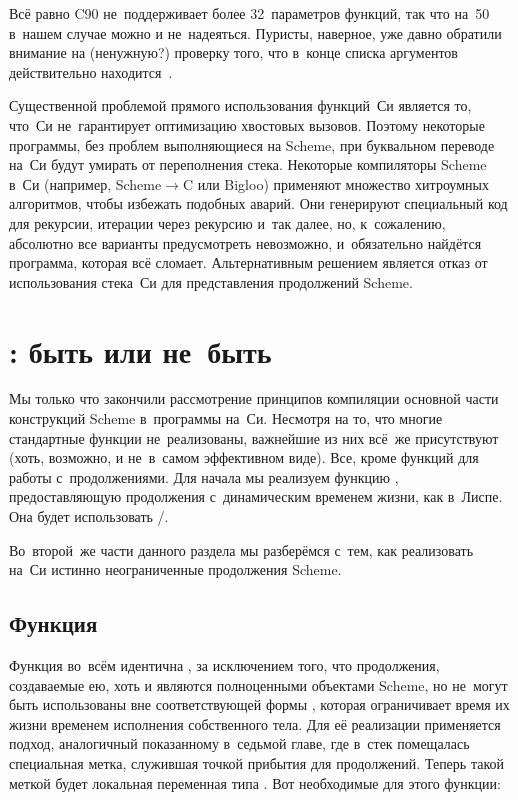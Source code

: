 Всё равно C90 не~поддерживает более 32~параметров функций, так что на~50 в~нашем
случае можно и не~надеяться. Пуристы, наверное, уже давно обратили внимание на
(ненужную?) проверку того, что в~конце списка аргументов 
действительно находится~\ic{()}.

\bigskip

Существенной проблемой прямого использования функций~Си является то, что~Си
не~гарантирует оптимизацию хвостовых вызовов. Поэтому некоторые программы, без
проблем выполняющиеся на Scheme, при буквальном переводе на~Си будут умирать
от переполнения стека. Некоторые компиляторы Scheme в~Си (например, Scheme$\to$C
или Bigloo) применяют множество хитроумных алгоритмов, чтобы избежать подобных
аварий. Они генерируют специальный код для рекурсии, итерации через рекурсию
и~так далее, но, к~сожалению, абсолютно все варианты предусмотреть невозможно,
и~обязательно найдётся программа, которая всё сломает. Альтернативным решением
является отказ от использования стека~Си для представления продолжений Scheme.


\section{\texorpdfstring{\protect{}: быть или не~быть}%
{call/cc: быть или не быть}}%
\label{cc/sect:call/cc}

Мы только что закончили рассмотрение принципов компиляции основной части
конструкций Scheme в~программы на~Си. Несмотря на то, что многие стандартные
функции не~реализованы, важнейшие из них всё~же присутствуют (хоть, возможно,
и не~в~самом эффективном виде). Все, кроме функций для работы с~продолжениями.
Для начала мы реализуем функцию , предоставляющую продолжения
с~динамическим временем жизни, как в~Лиспе. Она будет использовать
\slash{}.

Во~второй~же части данного раздела мы разберёмся с~тем, как реализовать
на~Си истинно неограниченные продолжения Scheme.


\subsection{\texorpdfstring{Функция~\protect{}}{Функция call/ep}}%
\label{cc/call/cc/ssect:ep}

Функция  во~всём идентична , за исключением того, что
продолжения, создаваемые ею, хоть и являются полноценными объектами Scheme, но
не~могут быть использованы вне соответствующей формы , которая
ограничивает время их жизни временем исполнения собственного тела.
 Для её реализации применяется подход,
аналогичный показанному в~седьмой главе, где в~стек помещалась специальная
метка, служившая точкой прибытия для продолжений. Теперь такой меткой будет
локальная переменная типа . Вот необходимые для этого функции:

